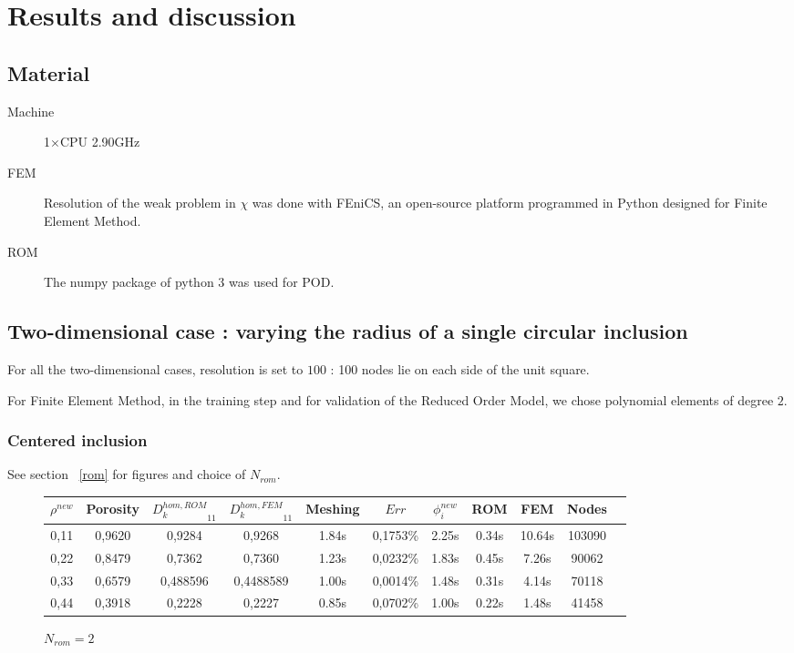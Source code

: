 \section{Results and discussion}\label{res}

\subsection{Material}

\begin{description}
\item [Machine] 1$\times$CPU 2.90GHz
\item [FEM] Resolution of the weak problem in $\chi$ was done with FEniCS, %
an open-source platform programmed in Python designed for Finite Element Method.
\item [ROM] The numpy package of python 3 was used for POD.
\end{description}

\subsection{Two-dimensional case : varying the radius of a single circular inclusion}

For all the two-dimensional cases, resolution is set to $100$ : %
100 nodes lie on each side of the unit square.

\par
For Finite Element Method, in the training step and for validation of the Reduced Order Model, we chose polynomial elements of degree $2$.

\subsubsection{Centered inclusion}

See section \ \ref{rom} for figures and choice of $N_{rom}$.
\begin{figure}[H]%
%
\begin{center}
\begin{tabular}{|c|c||c|c||c|c||c||c|c||c||c|}
\hline
\rowcolor{lightgray} $\rho^{new}$&Porosity&${D_k^{hom,ROM}}_{11}$&${D_k^{hom,FEM}}_{11}$&Meshing&$Err$&$\phi_i^{new}$&ROM&FEM&Nodes\\
\hline
0,11&0,9620&0,9284&0,9268&1.84s&0,1753\%&2.25s&0.34s&10.64s&103090\\
\hline
0,22&0,8479&0,7362&0,7360&1.23s&0,0232\%&1.83s&0.45s&7.26s&90062\\
\hline
0,33&0,6579&0,488596&0,4488589&1.00s&0,0014\%&1.48s&0.31s&4.14s&70118\\
\hline
0,44&0,3918&0,2228&0,2227&0.85s&0,0702\%&1.00s&0.22s&1.48s&41458\\
\hline
\end{tabular}
\end{center}
\caption{$N_{rom}=2$}
%
\end{figure}

